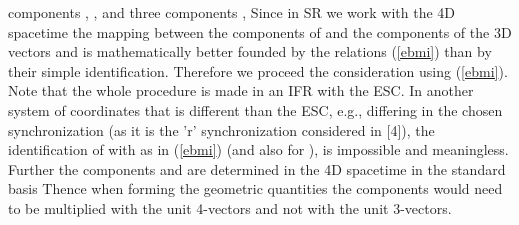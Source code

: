 \documentclass[a4paper,showpacs,preprintnumbers,amsmath,amssymb]{revtex4}
\begin{document}
components \coordHE{}, \coordHE{}, and three components \coordHE{}, \coordHE{} Since in SR we work with the 4D
spacetime the mapping between the components of \coordHE{} and the
components of the 3D vectors \coordHE{} and \coordHE{} is mathematically
better founded by the relations (\ref{ebmi}) than by their simple
identification. Therefore we proceed the consideration using (\ref{ebmi}).
Note that the whole procedure is made in an IFR with the ESC. In another
system of coordinates that is different than the ESC, e.g., differing in the
chosen synchronization (as it is the 'r' synchronization considered in [4]),
the identification of \coordHE{} with \coordHE{} as in (\ref{ebmi}) (and also
for \coordHE{}), is impossible and meaningless. Further the components \coordHE{}
and \coordHE{} are determined in the 4D spacetime in the standard basis \coordHE{} Thence when forming the geometric
quantities the components would need to be multiplied with the unit
4-vectors \coordHE{} and not with the unit 3-vectors.
\end{document}
